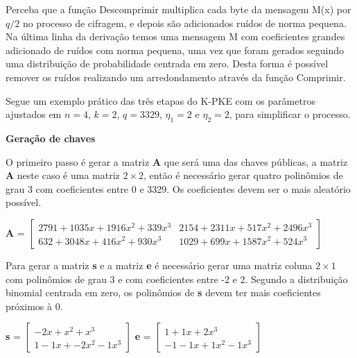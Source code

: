     Perceba que a função Descomprimir multiplica cada byte da mensagem M(x) por $q / 2$ no processo de cifragem, e depois são adicionados ruídos de norma pequena. Na última linha da derivação temos uma mensagem M com coeficientes grandes adicionado de ruídos com norma pequena, uma vez que foram gerados seguindo uma distribuição de probabilidade centrada em zero. Desta forma é possível remover os ruídos realizando um arredondamento através da função Comprimir.

    Segue um exemplo prático das três etapas do K-PKE com os parâmetros ajustados em $n = 4$, $k = 2$, $q = 3329$, $\eta_1 = 2$ e $\eta_2 = 2$, para simplificar o processo.

    \noindent
    \textbf{Geração de chaves}

        O primeiro passo é gerar a matriz \textbf{A} que será uma das chaves públicas, a matriz \textbf{A} neste caso é uma matriz $2 \times 2$, então é necessário gerar quatro polinômios de grau 3 com coeficientes entre 0 e 3329. Os coeficientes devem ser o mais aleatório possível.
        
        \begin{center}
            \textbf{A} = $\begin{bmatrix}
               2791 + 1035 x + 1916 x^2 + 339 x^3  & 2154 + 2311 x + 517 x^2 + 2496 x^3 \\
               632 + 3048 x + 416 x^2 + 930 x^3  & 1029 + 699 x + 1587 x^2 + 524 x^3
            \end{bmatrix}$
        \end{center}
        

        Para gerar a matriz \textbf{s} e a matriz \textbf{e} é necessário gerar uma matriz coluna $2 \times 1$ com polinômios de grau 3 e com coeficientes entre -2 e 2. Segundo a distribuição binomial centrada em zero, os polinômios de \textbf{s} devem ter mais coeficientes próximos à 0.

        \begin{center}
            \textbf{s} = $\begin{bmatrix}
               -2 x + x^2 + x^3  \\
                1 - 1 x + -2 x^2 - 1 x^3
            \end{bmatrix}$
            \textbf{e} = $\begin{bmatrix}
                1 + 1 x + 2 x^3 \\
                -1 -1 x + 1 x^2 -1 x^3
            \end{bmatrix}$
        \end{center}

